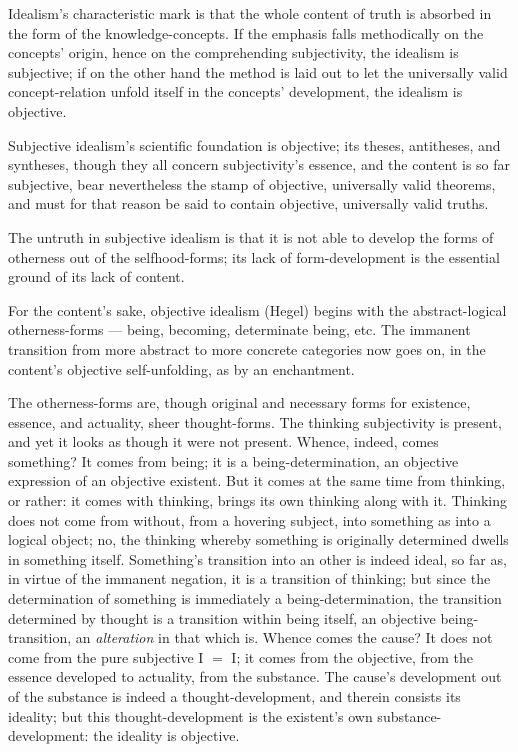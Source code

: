 \documentclass[12pt]{book}
\begin{document}
Idealism's characteristic mark is that the whole content of truth is
absorbed in the form of the knowledge-concepts. If the emphasis
falls methodically on the concepts' origin, hence on the
comprehending subjectivity, the idealism is subjective; if on the
other hand the method is laid out to let the universally valid
concept-relation unfold itself in the concepts' development, the
idealism is objective.

Subjective idealism's scientific foundation is objective; its
theses, antitheses, and syntheses, though they all concern
subjectivity's essence, and the content is so far subjective, bear
nevertheless the stamp of objective, universally
valid theorems, and must for that reason be said to contain
objective, universally valid truths.

The untruth in subjective idealism is that it is not able to develop
the forms of otherness out of the selfhood-forms; its lack of
form-development is the essential ground of its lack of content.

For the content's sake, objective idealism (Hegel) begins with the
abstract-logical otherness-forms --- being, becoming, determinate
being, etc. The immanent transition from more abstract to more
concrete categories now goes on, in the content's objective
self-unfolding, as by an enchantment.

The otherness-forms are, though original and necessary forms for
existence, essence, and actuality, sheer thought-forms. The thinking
subjectivity is present, and yet it looks as though it were not
present. Whence, indeed, comes something? It comes from being; it is
a being-determination, an objective expression of an objective
existent. But it comes at the same time from thinking, or rather: it
comes with thinking, brings its own thinking along with it. Thinking
does not come from without, from a hovering subject, into something
as into a logical object; no, the thinking whereby something is
originally determined dwells in something itself. Something's
transition into an other is indeed ideal, so far as, in virtue of
the immanent negation, it is a transition of thinking; but since the
determination of something is immediately a being-determination, the
transition determined by thought is a transition within being
itself, an objective being-transition, an \emph{alteration} in that
which is. Whence comes the cause? It does not come from the pure
subjective I $=$ I; it comes from the objective, from the essence
developed to actuality, from the substance. The cause's development
out of the substance is indeed a thought-development, and therein
consists its ideality; but this thought-development is the
existent's own substance-development: the ideality is objective.
\end{document}
